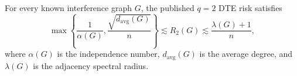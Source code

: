 For every known interference graph \(G\), the published \(q=2\) DTE risk satisfies
\[
\max\left\{\frac1{\alpha(G)},\frac{\sqrt{d_{\mathrm{avg}}(G)}}n\right\}
\lesssim R_2(G)
\lesssim\frac{\lambda(G)+1}{n},
\]
where \(\alpha(G)\) is the independence number, \(d_{\mathrm{avg}}(G)\) is the average degree, and \(\lambda(G)\) is the adjacency spectral radius.
